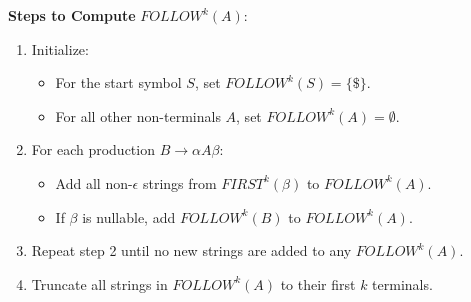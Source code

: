 \textbf{Steps to Compute} $FOLLOW^k(A)$:
\begin{enumerate}
\item Initialize:
   \begin{itemize}
   \item For the start symbol $S$, set $FOLLOW^k(S) = \{\$\}$.
   \item For all other non-terminals $A$, set $FOLLOW^k(A) = \emptyset$.
   \end{itemize}
\item For each production $B \to \alpha A \beta$:
   \begin{itemize}
   \item Add all non-$\epsilon$ strings from $FIRST^k(\beta)$ to $FOLLOW^k(A)$.
   \item If $\beta$ is nullable, add $FOLLOW^k(B)$ to $FOLLOW^k(A)$.
   \end{itemize}
\item Repeat step 2 until no new strings are added to any $FOLLOW^k(A)$.
\item Truncate all strings in $FOLLOW^k(A)$ to their first $k$ terminals.
\end{enumerate}
